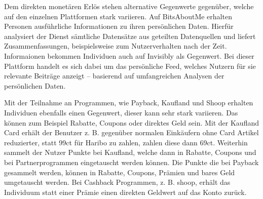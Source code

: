 \noindent Dem direkten monetären Erlös stehen alternative Gegenwerte gegenüber, welche auf den einzelnen Plattformen stark variieren. Auf BitsAboutMe erhalten Personen ausführliche Informationen zu ihren persönlichen Daten. Hierfür analysiert der Dienst sämtliche Datensätze aus geteilten Datenquellen und liefert Zusammenfassungen, beispielsweise zum Nutzerverhalten nach der Zeit. Informaionen bekommen Individuen auch auf Invisibly als Gegenwert. Bei dieser Plattform handelt es sich dabei um das persönliche Feed, welches Nutzern für sie relevante Beiträge anzeigt -- basierend auf umfangreichen Analysen der persönlichen Daten. \newline

\noindent Mit der Teilnahme an Programmen, wie Payback, Kaufland und Shoop erhalten Individuen ebenfalls einen Gegenwert, dieser kann sehr stark variieren. Das können zum Beispiel Rabatte, Coupons oder direktes Geld sein. 
Mit der Kaufland Card erhält der Benutzer z. B. gegenüber normalen Einkäufern ohne Card Artikel reduzierter, statt 99ct für Haribo zu zahlen, zahlen diese dann 69ct. Weiterhin sammelt der Nutzer Punkte bei Kaufland, welche dann in Rabatte, Coupons und bei Partnerprogrammen eingetauscht werden können. Die Punkte die bei Payback gesammelt werden, können in Rabatte, Coupons, Prämien und bares Geld umgetauscht werden.
Bei Cashback Programmen, z. B. shoop, erhält das Individuum statt einer Prämie einen direkten Geldwert auf das Konto zurück. 
